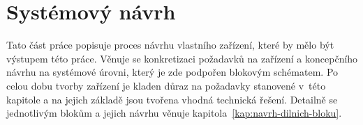 \chapter{Systémový návrh}

Tato část práce popisuje proces návrhu vlastního zařízení, které by mělo být výstupem této práce. Věnuje se konkretizaci požadavků na zařízení a koncepčního návrhu na systémové úrovni, který je zde podpořen blokovým schématem. Po celou dobu tvorby zařízení je kladen důraz na požadavky stanovené v~této kapitole a na jejich základě jsou tvořena vhodná technická řešení.  Detailně se jednotlivým blokům a jejich návrhu věnuje kapitola~\ref{kap:navrh-dilnich-bloku}.














